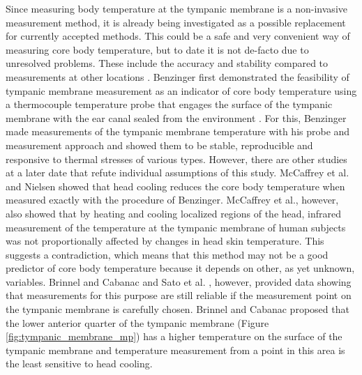 Since measuring body temperature at the tympanic membrane is a non-invasive measurement method, it is already being investigated as a possible replacement for currently accepted methods.
This could be a safe and very convenient way of measuring core body temperature, but to date it is not de-facto due to unresolved problems.
These include the accuracy and stability compared to measurements at other locations \cite{maxtonEstimatingCoreTemperature2004, fulbrookCoreBodyTemperature1997, mumaComparisonRectalAxillary1991, rothAgreementRectalTympanic1996}.
Benzinger first demonstrated the feasibility of tympanic membrane measurement as an indicator of core body temperature using a thermocouple temperature probe that engages the surface of the tympanic membrane with the ear canal sealed from the environment \cite{benzingerHeatRegulationHomeostasis1969, benzingerClinicalTemperatureNew1969, benzingerPhysicalHeatRegulation1959}.
For this, Benzinger made measurements of the tympanic membrane temperature with his probe and measurement approach and showed them to be stable, reproducible and responsive to thermal stresses of various types.
However, there are other studies at a later date that refute individual assumptions of this study.
McCaffrey et al. \cite{mccaffreyEffectHeadSkin1975} and Nielsen \cite{nielsenNaturalCoolingBrain1988} showed that head cooling reduces the core body temperature when measured exactly with the procedure of Benzinger.
McCaffrey et al., however, also showed that by heating and cooling localized regions of the head, infrared measurement of the temperature at the tympanic membrane of human subjects was not proportionally affected by changes in head skin temperature.
This suggests a contradiction, which means that this method may not be a good predictor of core body temperature because it depends on other, as yet unknown, variables.
Brinnel and Cabanac \cite{brinnelTympanicTemperatureCore1989} and Sato et al. \cite{satoReexaminationTympanicMembrane1996}, however, provided data showing that measurements for this purpose are still reliable if the measurement point on the tympanic membrane is carefully chosen. 
Brinnel and Cabanac proposed that the lower anterior quarter of the tympanic membrane (Figure \ref{fig:tympanic_membrane_mp}) has a higher temperature on the surface of the tympanic membrane and temperature measurement from a point in this area is the least sensitive to head cooling.
